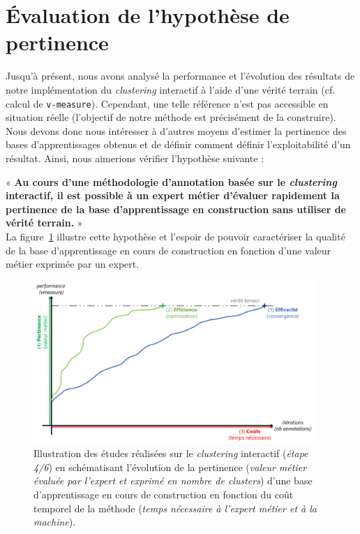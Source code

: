 \section{Évaluation de l'hypothèse de pertinence}
\label{section:4.4-HYPOTHESE-PERTINENCE}

	Jusqu'à présent, nous avons analysé la performance et l'évolution des résultats de notre implémentation du \textit{clustering} interactif à l'aide d'une vérité terrain (cf. calcul de \texttt{v-measure}).
	Cependant, une telle référence n'est pas accessible en situation réelle (l'objectif de notre méthode est précisément de la construire).
	Nous devons donc nous intéresser à d'autres moyens d'estimer la pertinence des bases d'apprentissages obtenus et de définir comment définir l'exploitabilité d'un résultat.
	Ainsi, nous aimerions vérifier l'hypothèse suivante :
	
	\begin{tcolorbox}[
		title=\faVial~\textbf{Hypothèse de pertinence}~\faVial,
		colback=colorTcolorboxHypothesis!15,
		colframe=colorTcolorboxHypothesis!75,
		width=\linewidth
	]
		« \textbf{
			Au cours d'une méthodologie d'annotation basée sur le \textit{clustering} interactif, il est possible à un expert métier d'évaluer rapidement la pertinence de la base d'apprentissage en construction sans utiliser de vérité terrain.
		} » \\
		
		La figure~\ref{figure:4.4-HYPOTHESE-PERTINENCE} illustre cette hypothèse et l'espoir de pouvoir caractériser la qualité de la base d'apprentissage en cours de construction en fonction d'une valeur métier exprimée par un expert.
		\begin{figure}[H]  %
			\centering
			\includegraphics[width=0.95\textwidth]{figures/hypotheses-04-pertinence}
			\caption{Illustration des études réalisées sur le \textit{clustering} interactif (\textit{étape 4/6}) en schématisant l'évolution de la pertinence (\textit{valeur métier évaluée par l'expert et exprimé en nombre de clusters}) d'une base d'apprentissage en cours de construction en fonction du coût temporel de la méthode (\textit{temps nécessaire à l'expert métier et à la machine}).}
			\label{figure:4.4-HYPOTHESE-PERTINENCE}
		\end{figure}

	\end{tcolorbox}
		
